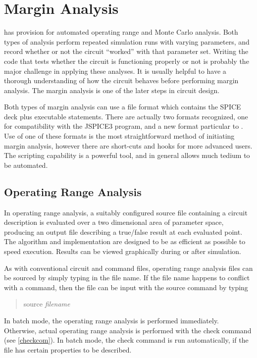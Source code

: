 \chapter{Margin Analysis}
\label{oprange}


{\WRspice} has provision for automated operating range and Monte Carlo
analysis.  Both types of analysis perform repeated simulation runs
with varying parameters, and record whether or not the circuit
``worked'' with that parameter set. Writing the code that tests
whether the circuit is functioning properly or not is probably the
major challenge in applying these analyses.  It is usually helpful
to have a thorough understanding of how the circuit behaves before
performing margin analysis.  The margin analysis is one of the later
steps in circuit design.

Both types of margin analysis can use a file format which contains the
SPICE deck plus executable statements.  There are actually two formats
recognized, one for compatibility with the JSPICE3 program, and a new
format particular to {\WRspice}.  Use of one of these formats is the
most straightforward method of initiating margin analysis, however
there are short-cuts and hooks for more advanced users.  The scripting
capability is a powerful tool, and in general allows much tedium to be
automated.


\section{Operating Range Analysis}


In operating range analysis, a suitably configured source file
containing a circuit description is evaluated over a two dimensional
area of parameter space, producing an output file describing a
true/false result at each evaluated point.  The algorithm and
implementation are designed to be as efficient as possible to speed
execution.  Results can be viewed graphically during or after
simulation.

As with conventional circuit and command files, operating range
analysis files can be sourced by simply typing in the file name.  If
the file name happens to conflict with a {\WRspice} command, then the
file can be input with the {\cb source} command by typing
\begin{quote}
{\vt source} {\it filename}
\end{quote}
In batch mode, the operating range analysis is performed immediately. 
Otherwise, actual operating range analysis is performed with the {\cb
check} command (see \ref{checkcom}).  In batch mode, the {\cb check}
command is run automatically, if the file has certain properties to be
described.

